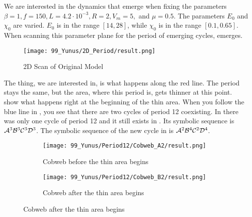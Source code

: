 We are interested in the dynamics that emerge when fixing the parameters $\beta = 1, f = 150, L = 4.2 \cdot 10^{-3}, R = 2, V_m = 5,$ and $\mu = 0.5$.
The parameters $E_0$ and $\chi_0$ are varied.
$E_0$ is in the range $[14, 28]$, while $\chi_0$ is in the range $[0.1, 0.65]$.
When scanning this parameter plane for the period of emerging cycles,  emerges.

\begin{figure}
    \centering
    \texttt{[image: 99\_Yunus/2D\_Period/result.png]}
    \caption{2D Scan of Original Model}
    \label{fig:yunus.2pi.2d.full}
\end{figure}

The thing, we are interested in, is what happens along the red line.
The period stays the same, but the area, where this period is, gets thinner at this point.
 show what happens right at the beginning of the thin area.
When you follow the blue line in , you see that there are two cycles of period 12 coexisting.
In  there was only one cycle of period 12 and it still exists in .
Its symbolic sequence is $\mathcal{A}^3\mathcal{B}^3\mathcal{C}^3\mathcal{D}^3$.
The symbolic sequence of the new cycle in  is $\mathcal{A}^2\mathcal{B}^4\mathcal{C}^2\mathcal{D}^4$.

\begin{figure}
    \centering
    \begin{subfigure}{0.4\textwidth}
        \centering
        \texttt{[image: 99\_Yunus/Period12/Cobweb\_A2/result.png]}
        \caption{Cobweb before the thin area begins}
        \label{fig:yunus.2pi.CobwebA2}
    \end{subfigure}
    \begin{subfigure}{0.4\textwidth}
        \centering
        \texttt{[image: 99\_Yunus/Period12/Cobweb\_B2/result.png]}
        \caption{Cobweb after the thin area begins}
        \label{fig:yunus.2pi.CobwebB2}
    \end{subfigure}
\end{figure}
